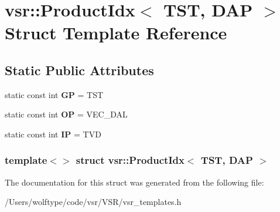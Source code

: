 \hypertarget{structvsr_1_1_product_idx_3_01_t_s_t_00_01_d_a_p_01_4}{\section{vsr\-:\-:Product\-Idx$<$ T\-S\-T, D\-A\-P $>$ Struct Template Reference}
\label{structvsr_1_1_product_idx_3_01_t_s_t_00_01_d_a_p_01_4}
}
\subsection*{Static Public Attributes}
\begin{DoxyCompactItemize}
\item 
\hypertarget{structvsr_1_1_product_idx_3_01_t_s_t_00_01_d_a_p_01_4_a4cfb5e6eff2626124791ff9a5aa67784}{static const int {\bfseries G\-P} = T\-S\-T}\label{structvsr_1_1_product_idx_3_01_t_s_t_00_01_d_a_p_01_4_a4cfb5e6eff2626124791ff9a5aa67784}

\item 
\hypertarget{structvsr_1_1_product_idx_3_01_t_s_t_00_01_d_a_p_01_4_adc817481eff30949b9904422093e7ad3}{static const int {\bfseries O\-P} = V\-E\-C\-\_\-\-D\-A\-L}\label{structvsr_1_1_product_idx_3_01_t_s_t_00_01_d_a_p_01_4_adc817481eff30949b9904422093e7ad3}

\item 
\hypertarget{structvsr_1_1_product_idx_3_01_t_s_t_00_01_d_a_p_01_4_a783844c6d941b694518f2afc035f0bd4}{static const int {\bfseries I\-P} = T\-V\-D}\label{structvsr_1_1_product_idx_3_01_t_s_t_00_01_d_a_p_01_4_a783844c6d941b694518f2afc035f0bd4}

\end{DoxyCompactItemize}
\subsubsection*{template$<$$>$ struct vsr\-::\-Product\-Idx$<$ T\-S\-T, D\-A\-P $>$}



The documentation for this struct was generated from the following file\-:\begin{DoxyCompactItemize}
\item 
/\-Users/wolftype/code/vsr/\-V\-S\-R/vsr\-\_\-templates.\-h\end{DoxyCompactItemize}
